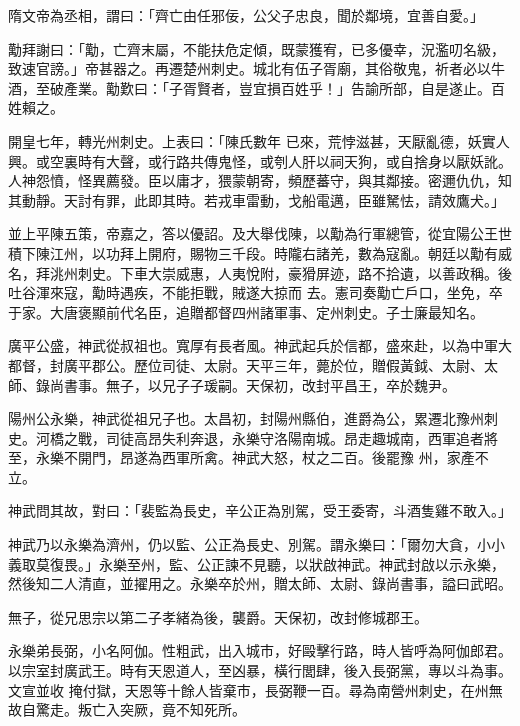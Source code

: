 \begin{pinyinscope}
 隋文帝為丞相，謂曰：「齊亡由任邪佞，公父子忠良，聞於鄰境，宜善自愛。」



 勱拜謝曰：「勱，亡齊末屬，不能扶危定傾，既蒙獲宥，已多優幸，況濫叨名級，致速官謗。」帝甚器之。再遷楚州刺史。城北有伍子胥廟，其俗敬鬼，祈者必以牛酒，至破產業。勱歎曰：「子胥賢者，豈宜損百姓乎！」告諭所部，自是遂止。百姓賴之。



 開皇七年，轉光州刺史。上表曰：「陳氏數年
 已來，荒悖滋甚，天厭亂德，妖實人興。或空裏時有大聲，或行路共傳鬼怪，或刳人肝以祠天狗，或自捨身以厭妖訛。人神怨憤，怪異薦發。臣以庸才，猥蒙朝寄，頻歷蕃守，與其鄰接。密邇仇仇，知其動靜。天討有罪，此即其時。若戎車雷動，戈船電邁，臣雖駑怯，請效鷹犬。」



 並上平陳五策，帝嘉之，答以優詔。及大舉伐陳，以勱為行軍總管，從宜陽公王世積下陳江州，以功拜上開府，賜物三千段。時隴右諸羌，數為寇亂。朝廷以勱有威名，拜洮州刺史。下車大崇威惠，人夷悅附，豪猾屏迹，路不拾遺，以善政稱。後吐谷渾來寇，勱時遇疾，不能拒戰，賊遂大掠而
 去。憲司奏勱亡戶口，坐免，卒于家。大唐褒顯前代名臣，追贈都督四州諸軍事、定州刺史。子士廉最知名。



 廣平公盛，神武從叔祖也。寬厚有長者風。神武起兵於信都，盛來赴，以為中軍大都督，封廣平郡公。歷位司徒、太尉。天平三年，薨於位，贈假黃鉞、太尉、太師、錄尚書事。無子，以兄子子瑗嗣。天保初，改封平昌王，卒於魏尹。



 陽州公永樂，神武從祖兄子也。太昌初，封陽州縣伯，進爵為公，累遷北豫州刺史。河橋之戰，司徒高昂失利奔退，永樂守洛陽南城。昂走趣城南，西軍追者將至，永樂不開門，昂遂為西軍所禽。神武大怒，杖之二百。後罷豫
 州，家產不立。



 神武問其故，對曰：「裴監為長史，辛公正為別駕，受王委寄，斗酒隻雞不敢入。」



 神武乃以永樂為濟州，仍以監、公正為長史、別駕。謂永樂曰：「爾勿大貪，小小義取莫復畏。」永樂至州，監、公正諫不見聽，以狀啟神武。神武封啟以示永樂，然後知二人清直，並擢用之。永樂卒於州，贈太師、太尉、錄尚書事，謚曰武昭。



 無子，從兄思宗以第二子孝緒為後，襲爵。天保初，改封修城郡王。



 永樂弟長弼，小名阿伽。性粗武，出入城市，好毆擊行路，時人皆呼為阿伽郎君。以宗室封廣武王。時有天恩道人，至凶暴，橫行閭肆，後入長弼黨，專以斗為事。文宣並收
 掩付獄，天恩等十餘人皆棄市，長弼鞭一百。尋為南營州刺史，在州無故自驚走。叛亡入突厥，竟不知死所。




\end{pinyinscope}
